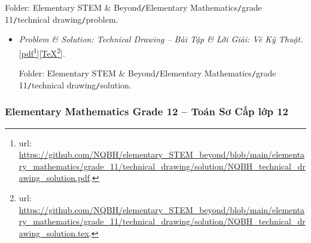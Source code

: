 \documentclass[12pt,oneside]{book}
\begin{document}
\begin{enumerate}
	Folder: {\sf Elementary STEM \& Beyond{\tt/}Elementary Mathematics{\tt/}grade 11{\tt/}technical drawing{\tt/}problem}.
	\begin{itemize}
		\item {\it Problem \& Solution: Technical Drawing -- Bài Tập \& Lời Giải: Vẽ Kỹ Thuật}. [\href{https://github.com/NQBH/elementary_STEM_beyond/blob/main/elementary_mathematics/grade_11/technical_drawing/solution/NQBH_technical_drawing_solution.pdf}{pdf}\footnote{{\sc url}: \url{https://github.com/NQBH/elementary_STEM_beyond/blob/main/elementary_mathematics/grade_11/technical_drawing/solution/NQBH_technical_drawing_solution.pdf}.}][\href{https://github.com/NQBH/elementary_STEM_beyond/blob/main/elementary_mathematics/grade_11/technical_drawing/solution/NQBH_technical_drawing_solution.tex}{\TeX}\footnote{{\sc url}: \url{https://github.com/NQBH/elementary_STEM_beyond/blob/main/elementary_mathematics/grade_11/technical_drawing/solution/NQBH_technical_drawing_solution.tex}.}].
		
		Folder: {\sf Elementary STEM \& Beyond{\tt/}Elementary Mathematics{\tt/}grade 11{\tt/}technical drawing{\tt/}solution}.
	\end{itemize}
\end{enumerate}

\subsubsection{Elementary Mathematics Grade 12 -- Toán Sơ Cấp lớp 12}
\end{document}
